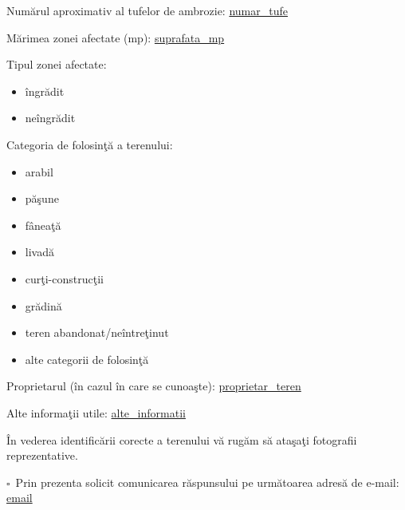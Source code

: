 \documentclass[11pt,a4paper]{article}
\newcommand{\checkboxempty}{$\square$}
\begin{document}
\hrulefill

\vspace{0.3cm}

Numărul aproximativ al tufelor de ambrozie: \underline{ {{numar_tufe}} }

\vspace{0.3cm}

Mărimea zonei afectate (mp): \underline{ {{suprafata_mp}} }

\vspace{0.25cm}

Tipul zonei afectate:
\begin{itemize}[leftmargin=2cm,label=\checkboxempty]
\item îngrădit
\item neîngrădit
\end{itemize}

\vspace{0.2cm}

Categoria de folosinţă a terenului:
\begin{itemize}[leftmargin=2cm,label=\checkboxempty]
\item arabil
\item păşune
\item fâneaţă
\item livadă
\item curţi-construcţii
\item grădină
\item teren abandonat/neîntreţinut
\item alte categorii de folosinţă
\end{itemize}

\vspace{0.6cm}

Proprietarul (în cazul în care se cunoaşte): \underline{ {{proprietar_teren}} }

\vspace{0.3cm}

Alte informaţii utile: \underline{ {{alte_informatii}} }

\vspace{0.6cm}

\hspace{1cm}În vederea identificării corecte a terenului vă rugăm să ataşaţi fotografii reprezentative.

\vspace{0.6cm}

\checkboxempty\ Prin prezenta solicit comunicarea răspunsului pe următoarea adresă de e-mail: \underline{ {{email}} }
\end{document}
